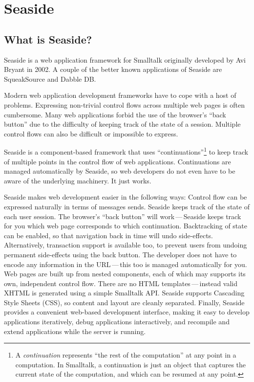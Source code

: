 \documentclass[a4paper,10pt,twoside]{book}
\begin{document}
	\sloppy
\fi
\chapter{Seaside}
\label{cha:seaside}


\section{What is Seaside?}

Seaside is a web application framework for Smalltalk originally developed by Avi Bryant in 2002.
A couple of the better known applications of Seaside are SqueakSource\cite{SqueakSource} and Dabble DB\cite{DabbleDB}.

Modern web application development frameworks have to cope with a host of problems. Expressing non-trivial control flows across multiple web pages is often cumbersome. Many web applications forbid the use of the browser's ``back button'' due to the difficulty of keeping track of the state of a session. Multiple control flows can also be difficult or impossible to express.

Seaside is a component-based framework that uses ``continuations''\footnote{A \emph{continuation} represents ``the rest of the computation'' at any point in a computation. In Smalltalk, a continuation is just an object that captures the current state of the computation, and which can be resumed at any point.} to keep track of multiple points in the control flow of web applications. Continuations are managed automatically by Seaside, so web developers do not even have to be aware of the underlying machinery. It just works.

Seaside makes web development easier in the following ways:
Control flow can be expressed naturally in terms of messages sends.
Seaside keeps track of the state of each user session.
The browser's ``back button'' will work\,---\,Seaside keeps track for you which web page corresponds to which continuation.
Backtracking of state can be enabled, so that navigation back in time will undo side-effects.
Alternatively, transaction support is available too, to prevent users from undoing permanent side-effects using the back button.
The developer does not have to encode any information in the URL\,---\,this too is managed automatically for you.
Web pages are built up from nested components, each of which may supports its own, independent control flow.
There are no HTML templates\,---\,instead valid XHTML is generated using a simple Smalltalk API.
Seaside supports Cascading Style Sheets (CSS), so content and layout are cleanly separated.
Finally, Seaside provides a convenient web-based development interface, making it easy to develop applications iteratively, debug applications interactively, and recompile and extend applications while the server is running.
\end{document}
